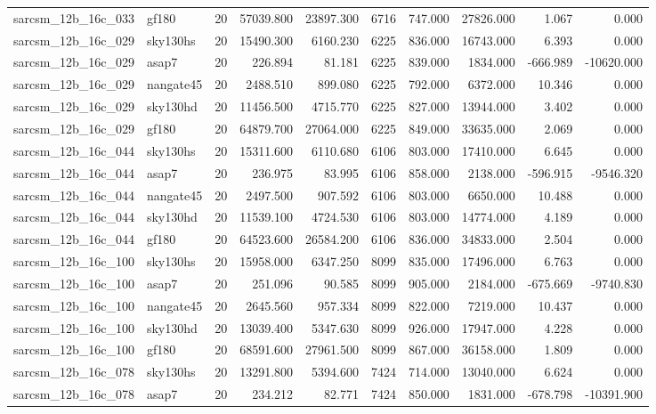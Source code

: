 \begin{tabular}{llrrrrrrrr}
sarcsm\_12b\_16c\_033 & gf180 & 20 & 57039.800 & 23897.300 & 6716 & 747.000 & 27826.000 & 1.067 & 0.000 \\
sarcsm\_12b\_16c\_029 & sky130hs & 20 & 15490.300 & 6160.230 & 6225 & 836.000 & 16743.000 & 6.393 & 0.000 \\
sarcsm\_12b\_16c\_029 & asap7 & 20 & 226.894 & 81.181 & 6225 & 839.000 & 1834.000 & -666.989 & -10620.000 \\
sarcsm\_12b\_16c\_029 & nangate45 & 20 & 2488.510 & 899.080 & 6225 & 792.000 & 6372.000 & 10.346 & 0.000 \\
sarcsm\_12b\_16c\_029 & sky130hd & 20 & 11456.500 & 4715.770 & 6225 & 827.000 & 13944.000 & 3.402 & 0.000 \\
sarcsm\_12b\_16c\_029 & gf180 & 20 & 64879.700 & 27064.000 & 6225 & 849.000 & 33635.000 & 2.069 & 0.000 \\
sarcsm\_12b\_16c\_044 & sky130hs & 20 & 15311.600 & 6110.680 & 6106 & 803.000 & 17410.000 & 6.645 & 0.000 \\
sarcsm\_12b\_16c\_044 & asap7 & 20 & 236.975 & 83.995 & 6106 & 858.000 & 2138.000 & -596.915 & -9546.320 \\
sarcsm\_12b\_16c\_044 & nangate45 & 20 & 2497.500 & 907.592 & 6106 & 803.000 & 6650.000 & 10.488 & 0.000 \\
sarcsm\_12b\_16c\_044 & sky130hd & 20 & 11539.100 & 4724.530 & 6106 & 803.000 & 14774.000 & 4.189 & 0.000 \\
sarcsm\_12b\_16c\_044 & gf180 & 20 & 64523.600 & 26584.200 & 6106 & 836.000 & 34833.000 & 2.504 & 0.000 \\
sarcsm\_12b\_16c\_100 & sky130hs & 20 & 15958.000 & 6347.250 & 8099 & 835.000 & 17496.000 & 6.763 & 0.000 \\
sarcsm\_12b\_16c\_100 & asap7 & 20 & 251.096 & 90.585 & 8099 & 905.000 & 2184.000 & -675.669 & -9740.830 \\
sarcsm\_12b\_16c\_100 & nangate45 & 20 & 2645.560 & 957.334 & 8099 & 822.000 & 7219.000 & 10.437 & 0.000 \\
sarcsm\_12b\_16c\_100 & sky130hd & 20 & 13039.400 & 5347.630 & 8099 & 926.000 & 17947.000 & 4.228 & 0.000 \\
sarcsm\_12b\_16c\_100 & gf180 & 20 & 68591.600 & 27961.500 & 8099 & 867.000 & 36158.000 & 1.809 & 0.000 \\
sarcsm\_12b\_16c\_078 & sky130hs & 20 & 13291.800 & 5394.600 & 7424 & 714.000 & 13040.000 & 6.624 & 0.000 \\
sarcsm\_12b\_16c\_078 & asap7 & 20 & 234.212 & 82.771 & 7424 & 850.000 & 1831.000 & -678.798 & -10391.900 \\

\end{tabular}
